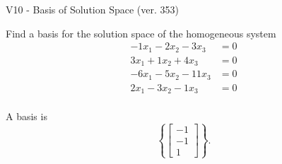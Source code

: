 \begin{exercise}
  \begin{exerciseTitle}V10 - Basis of Solution Space (ver. 353)\end{exerciseTitle}
  \begin{exerciseStatement}
    Find a basis for the solution space of the homogeneous system 
\begin{align*}
 -1 x_ 1 -2 x_ 2 -3 x_ 3 &= 0  \\ 
  3 x_ 1 + 1 x_ 2 + 4 x_ 3 &= 0  \\ 
  -6 x_ 1 -5 x_ 2 -11 x_ 3 &= 0  \\ 
  2 x_ 1 -3 x_ 2 -1 x_ 3 &= 0  \\ 
 \end{align*}


 
  \end{exerciseStatement}

  \begin{exerciseAnswer}
   A basis is   
\[\left\{\left[\begin{array}{c}
-1 \\
-1 \\
1
\end{array}\right]\right\}.\]

  


  \end{exerciseAnswer}
\end{exercise}